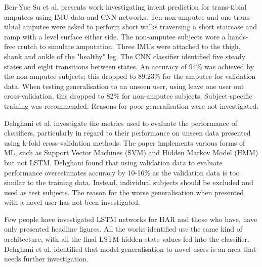 \documentclass[sensors,article,submit,moreauthors,pdftex]{Definitions/mdpi}
\begin{document}
Ben-Yue Su et al. presents work investigating intent prediction for trans-tibial amputees using IMU data and CNN networks\cite{Su2019}. Ten non-amputee and one trans-tibial amputee were asked to perform short walks traversing a short staircase and ramp with a level surface either side. The non-amputee subjects wore a hands-free crutch to simulate amputation. Three IMUs were attached to the thigh, shank and ankle of the "healthy" leg. The CNN classifier identified five steady states and eight transitions between states. An accuracy of 94\% was achieved by the non-amputee subjects; this dropped to 89.23\% for the amputee for validation data. When testing generalisation to an unseen user, using leave one user out cross-validation, this dropped to 82\% for non-amputee subjects. Subject-specific training was recommended. Reasons for poor generalisation were not investigated.

Dehghani et al. investigate the metrics used to evaluate the performance of classifiers, particularly in regard to their performance on unseen data presented using k-fold cross-validation methods\cite{Dehghani2019}. The paper implements various forms of ML, such as Support Vector Machines (SVM) and Hidden Markov Model (HMM) but not LSTM. Dehghani found that using validation data to evaluate performance overestimates accuracy by 10-16\% as the validation data is too similar to the training data. Instead, individual subjects should be excluded and used as test subjects. The reason for the worse generalisation when presented with a novel user has not been investigated.

Few people have investigated LSTM networks for HAR and those who have, have only presented headline figures. All the works identified use the same kind of architecture, with all the final LSTM hidden state values fed into the classifier. Dehghani et al. identified that model generalisation to novel users is an area that needs further investigation\cite{Dehghani2019}.

\end{document}
